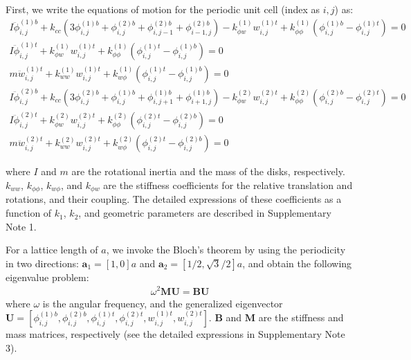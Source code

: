 \documentclass[aps,preprint,onecolumn,showpacs,superscriptaddress,groupedaddress]{revtex4}  %
\begin{document}
First, we write the equations of motion for the periodic unit cell (index as $i, j$) as: %
\begin{subequations}
\begin{eqnarray}
  I\ddot \phi _{i,j}^{(1)b} + {k_{cc}}(3\phi _{i,j}^{(1)b} + \phi _{i,j}^{(2)b} + \phi _{i,j - 1}^{(2)b} + \phi _{i - 1,j}^{(2)b}) - k_{\phi w}^{(1)}w_{i,j}^{(1)t} + k_{\phi \phi }^{(1)}(\phi _{i,j}^{(1)b} - \phi _{i,j}^{(1)t}) = 0 \\ 
  I\ddot \phi _{i,j}^{(1)t} + k_{\phi w}^{(1)}w_{i,j}^{(1)t} + k_{\phi \phi }^{(1)}(\phi _{i,j}^{(1)t} - \phi _{i,j}^{(1)b}) = 0 \\ 
  m\ddot w_{i,j}^{(1)t} + k_{ww}^{(1)}w_{i,j}^{(1)t} + k_{w\phi }^{(1)}(\phi _{i,j}^{(1)t} - \phi _{i,j}^{(1)b}) = 0 
 \end{eqnarray}
 \end{subequations}
 \begin{subequations}
\begin{eqnarray}
  I\ddot \phi _{i,j}^{(2)b} + {k_{cc}}(3\phi _{i,j}^{(2)b} + \phi _{i,j}^{(1)b} + \phi _{i,j + 1}^{(1)b} + \phi _{i + 1,j}^{(1)b}) - k_{\phi w}^{(2)}w_{i,j}^{(2)t} + k_{\phi \phi }^{(2)}(\phi _{i,j}^{(2)b} - \phi _{i,j}^{(2)t}) = 0 \\ 
  I\ddot \phi _{i,j}^{(2)t} + k_{\phi w}^{(2)}w_{i,j}^{(2)t} + k_{\phi \phi }^{(2)}(\phi _{i,j}^{(2)t} - \phi _{i,j}^{(2)b}) = 0 \\ 
  m\ddot w_{i,j}^{(2)t} + k_{ww}^{(2)}w_{i,j}^{(2)t} + k_{w\phi }^{(2)}(\phi _{i,j}^{(2)t} - \phi _{i,j}^{(2)b}) = 0 
\end{eqnarray}
 \end{subequations}


\noindent where $I$ and $m$ are the rotational inertia and the mass of the disks, respectively. $k_{ww}$, $k_{\phi \phi}$, $k_{w \phi}$, and $k_{\phi w}$ are the stiffness coefficients for the relative translation and rotations, and their coupling. The detailed expressions of these coefficients as a function of $k_1$, $k_2$, and geometric parameters are described in Supplementary Note 1.

For a lattice length of $a$, we invoke the Bloch's theorem by using the periodicity in two directions: $\mathbf{a}_1=[1,0]a$ and $\mathbf{a}_2=[1/2,\sqrt{3}/2]a$, and obtain the following eigenvalue problem:
\begin{eqnarray}
\omega^2 \mathbf{M} \mathbf{U}= \mathbf{B}\mathbf{U}
\end{eqnarray}
where $\omega$ is the angular frequency, and the generalized eigenvector $\mathbf{U}=[\phi_{i,j}^{(1)b}, \phi_{i,j}^{(2)b}, \phi_{i,j}^{(1)t}, \phi_{i,j}^{(2)t}, w_{i,j}^{(1)t}, w_{i,j}^{(2)t}]$. $\mathbf{B}$ and $\mathbf{M}$ are the stiffness and mass matrices, respectively (see the detailed expressions in Supplementary Note 3).
\end{document}
